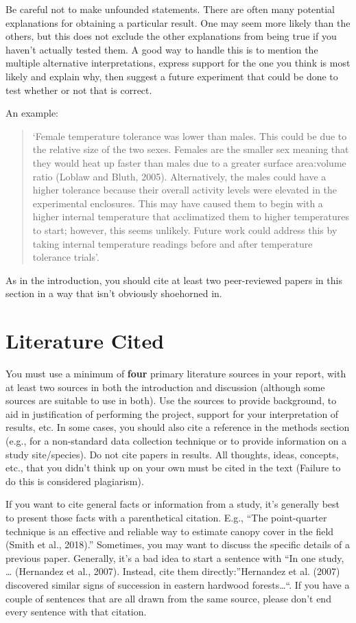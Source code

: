 \documentclass[]{book}
\begin{document}
Be careful not to make unfounded statements. There are often many
potential explanations for obtaining a particular result. One may seem
more likely than the others, but this does not exclude the other
explanations from being true if you haven't actually tested them. A good
way to handle this is to mention the multiple alternative
interpretations, express support for the one you think is most likely
and explain why, then suggest a future experiment that could be done to
test whether or not that is correct.

An example:

\begin{quote}
`Female temperature tolerance was lower than males. This could be due to
the relative size of the two sexes. Females are the smaller sex meaning
that they would heat up faster than males due to a greater surface
area:volume ratio (Loblaw and Bluth, 2005). Alternatively, the males
could have a higher tolerance because their overall activity levels were
elevated in the experimental enclosures. This may have caused them to
begin with a higher internal temperature that acclimatized them to
higher temperatures to start; however, this seems unlikely. Future work
could address this by taking internal temperature readings before and
after temperature tolerance trials'.
\end{quote}

As in the introduction, you should cite at least two peer-reviewed
papers in this section in a way that isn't obviously shoehorned in.

\section{Literature Cited}\label{literature-cited}

You must use a minimum of \textbf{four} primary literature sources in
your report, with at least two sources in both the introduction and
discussion (although some sources are suitable to use in both). Use the
sources to provide background, to aid in justification of performing the
project, support for your interpretation of results, etc. In some cases,
you should also cite a reference in the methods section (e.g., for a
non-standard data collection technique or to provide information on a
study site/species). Do not cite papers in results. All thoughts, ideas,
concepts, etc., that you didn't think up on your own must be cited in
the text (Failure to do this is considered plagiarism).

If you want to cite general facts or information from a study, it's
generally best to present those facts with a parenthetical citation.
E.g., ``The point-quarter technique is an effective and reliable way to
estimate canopy cover in the field (Smith et al., 2018).'' Sometimes,
you may want to discuss the specific details of a previous paper.
Generally, it's a bad idea to start a sentence with ``In one study,
\ldots{} (Hernandez et al., 2007). Instead, cite them
directly:''Hernandez et al. (2007) discovered similar signs of
succession in eastern hardwood forests\ldots{}``. If you have a couple
of sentences that are all drawn from the same source, please don't end
every sentence with that citation.
\end{document}
